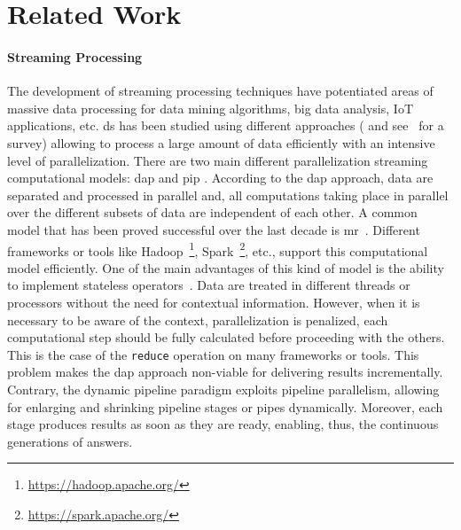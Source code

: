 \section{Related Work}\label{section:related-work}

\paragraph{Streaming Processing}
The development of streaming processing techniques have potentiated areas of massive data processing for data mining algorithms, big data analysis, IoT applications, etc.  \acrfull{ds} has been studied using different approaches (\cite{SA-libro} and see~\cite{hr19} for a survey) allowing to process a large amount of data efficiently with an intensive level of parallelization. There are two main different parallelization streaming computational models: \acrfull{dap} and \acrfull{pip} \cite{exploiting, onthefly}. According to the \acrshort{dap} approach, data are separated and processed in parallel and, all  computations taking place in parallel over the different subsets of data are independent of each other. 
A common model that has been proved successful over the last decade is \acrfull{mr}~\cite{mapreduce}. Different frameworks or tools like Hadoop~\footnote{\url{https://hadoop.apache.org/}}, Spark~\footnote{\url{https://spark.apache.org/}}, etc., support this computational model efficiently. One of the main advantages of this kind of model is the ability to implement stateless operators~\cite{hr19}. Data are treated in different threads or processors without the need for contextual information. However, when it is necessary to be aware of the context, parallelization is penalized, each computational step should be fully calculated before proceeding with the others. This is the case of the  \texttt{reduce} operation on many frameworks or tools. This problem makes the \acrshort{dap} approach non-viable for delivering results incrementally. Contrary, the dynamic pipeline paradigm exploits pipeline parallelism, allowing for enlarging and shrinking pipeline stages or pipes dynamically. Moreover, each stage produces results as soon as they are ready, enabling, thus, the continuous generations of answers.  

